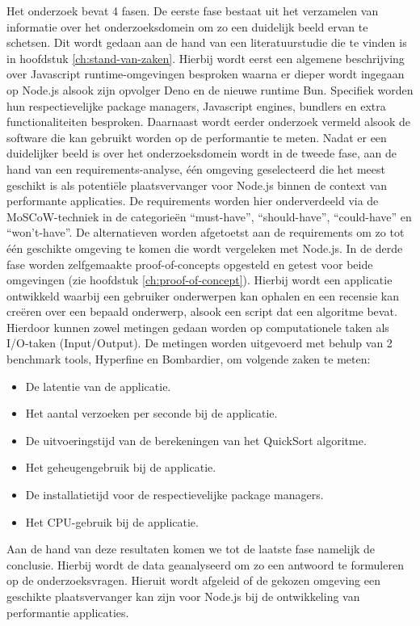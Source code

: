 Het onderzoek bevat 4 fasen. 
De eerste fase bestaat uit het verzamelen van informatie over het onderzoeksdomein om zo een duidelijk beeld ervan te schetsen.
Dit wordt gedaan aan de hand van een literatuurstudie die te vinden is in hoofdstuk \ref{ch:stand-van-zaken}. 
Hierbij wordt eerst een algemene beschrijving over Javascript runtime-omgevingen besproken waarna 
er dieper wordt ingegaan op Node.js alsook zijn opvolger Deno en de nieuwe runtime Bun. 
Specifiek worden hun respectievelijke package managers, Javascript engines, bundlers en extra functionaliteiten besproken.
Daarnaast wordt eerder onderzoek vermeld alsook de software die kan gebruikt worden op de performantie te meten.
Nadat er een duidelijker beeld is over het onderzoeksdomein wordt in de tweede fase, aan de hand van een requirements-analyse, 
één omgeving geselecteerd die het meest geschikt is als potentiële plaatsvervanger voor Node.js binnen de context van performante applicaties.
De requirements worden hier onderverdeeld via de MoSCoW-techniek in de categorieën “must-have”, “should-have”, “could-have” en “won't-have”. 
De alternatieven worden afgetoetst aan de requirements om zo tot één geschikte omgeving te komen die wordt vergeleken met Node.js.
In de derde fase worden zelfgemaakte proof-of-concepts opgesteld en getest voor beide omgevingen (zie hoofdstuk \ref{ch:proof-of-concept}). 
Hierbij wordt een applicatie ontwikkeld waarbij een gebruiker onderwerpen kan ophalen en 
een recensie kan creëren over een bepaald onderwerp,
alsook een script dat een algoritme bevat. Hierdoor kunnen zowel metingen gedaan worden op computationele taken als I/O-taken (Input/Output).
De metingen worden uitgevoerd met behulp van 2 benchmark tools, Hyperfine en Bombardier, om volgende zaken te meten:
\begin{itemize}
    \item De latentie van de applicatie.
    \item Het aantal verzoeken per seconde bij de applicatie.
    \item De uitvoeringstijd van de berekeningen van het QuickSort algoritme.
    \item Het geheugengebruik bij de applicatie.
    \item De installatietijd voor de respectievelijke package managers.
    \item Het CPU-gebruik bij de applicatie.
\end{itemize}
Aan de hand van deze resultaten komen we tot de laatste fase namelijk de conclusie. 
Hierbij wordt de data geanalyseerd om zo een antwoord te formuleren op de onderzoeksvragen.
Hieruit wordt afgeleid of de gekozen omgeving een geschikte plaatsvervanger kan zijn voor Node.js 
bij de ontwikkeling van performantie applicaties.
